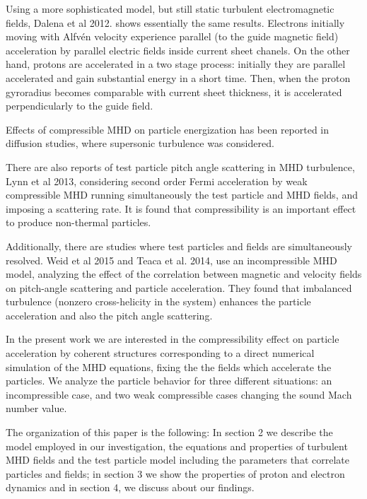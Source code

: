 \documentclass[%
aip,pop,amsmath,amssymb,
 reprint,%
]{revtex4-1}
\begin{document}
Using a more sophisticated model, but still static turbulent 
electromagnetic fields, Dalena et 
al 2012.\cite{Dalena2012} shows essentially the same results.
Electrons initially moving with 
Alfv\'en velocity experience parallel (to the guide magnetic field)
acceleration by 
parallel electric fields inside current sheet chanels. 
On the other hand, protons are accelerated in a two stage process: 
initially they are parallel accelerated and gain substantial energy 
in a short time. Then, when the proton gyroradius becomes
comparable with current sheet thickness,
it is accelerated perpendicularly to the guide field.  


Effects of compressible MHD on particle energization has been reported 
in diffusion studies\cite{Chandran2003,CHO1}, where supersonic
turbulence was considered.

There are also reports of test particle pitch angle scattering in 
MHD turbulence, Lynn et al 2013\cite{Lynn2013}, considering 
second order Fermi acceleration by weak compressible MHD running simultaneously
the test particle and MHD fields, and imposing a scattering rate.
It is found that compressibility 
is an important effect to produce non-thermal particles. 

Additionally, there are
studies where test particles and fields are simultaneously resolved.
Weid et al 2015\cite{Weidl2015} and Teaca et al. 2014\cite{Bogdan2014}, 
use an incompressible MHD model, analyzing the effect of the 
correlation between magnetic and velocity fields 
on pitch-angle scattering and particle 
acceleration. They found that imbalanced turbulence (nonzero cross-helicity in 
the system) enhances the particle acceleration and also 
the pitch angle scattering.

In the present work we are interested in the compressibility effect 
on particle 
acceleration by coherent structures corresponding to a direct numerical 
simulation of the MHD equations, fixing the the fields which accelerate
the particles. 
We 
analyze the particle behavior for three different situations: an 
incompressible case, and 
two weak compressible cases changing the sound Mach number value. 

The organization of this paper is the following:  In section 2  
we describe the model 
employed in our investigation, the equations and properties of 
turbulent MHD fields and the 
test particle model including the parameters that correlate 
particles and fields; 
in section 3 we show the properties of proton and electron dynamics 
and in section 4, we
discuss about our findings.
\end{document}
